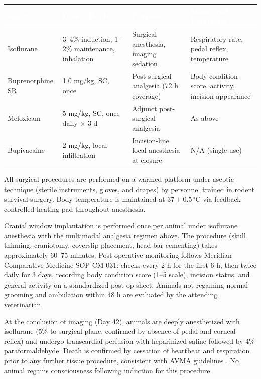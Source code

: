 \noindent
\begin{tabularx}{\linewidth}{@{}
  >{\small}p{2.6cm}
  >{\small}X
  >{\small\centering\arraybackslash}p{2.0cm}
  >{\small}p{2.6cm}
  @{}}
\toprule
\rowcolor{VetTeal}
\textcolor{white}{\textbf{Agent}} &
\textcolor{white}{\textbf{Dose / Route}} &
\textcolor{white}{\textbf{Purpose}} &
\textcolor{white}{\textbf{Monitored Parameter}} \\
\midrule
Isoflurane & 3--4\% induction, 1--2\% maintenance, inhalation & Surgical anesthesia, imaging
  sedation & Respiratory rate, pedal reflex, temperature \\
\rowcolor{LightFog}
Buprenorphine SR & 1.0 mg/kg, SC, once & Post-surgical analgesia (72 h coverage) & Body
  condition score, activity, incision appearance \\
Meloxicam & 5 mg/kg, SC, once daily $\times$ 3 d & Adjunct post-surgical analgesia & As above \\
\rowcolor{LightFog}
Bupivacaine & 2 mg/kg, local infiltration & Incision-line local anesthesia at closure &
  N/A (single use) \\
\bottomrule
\end{tabularx}

{\footnotesize\color{ProtocolNavy!70}
All surgical procedures are performed on a warmed platform under aseptic technique
(sterile instruments, gloves, and drapes) by personnel trained in rodent survival surgery.
Body temperature is maintained at $37\pm0.5\,^{\circ}\mathrm{C}$ via feedback-controlled
heating pad throughout anesthesia.\par}

\vspace{6pt}

Cranial window implantation is performed once per animal under isoflurane anesthesia with the
multimodal analgesia regimen above. The procedure (skull thinning, craniotomy, coverslip
placement, head-bar cementing) takes approximately 60--75 minutes. Post-operative monitoring
follows Meridian Comparative Medicine SOP CM-031: checks every 2 h for the first 6 h, then
twice daily for 3 days, recording body condition score (1--5 scale), incision status, and
general activity on a standardized post-op sheet. Animals not regaining normal grooming and
ambulation within 48 h are evaluated by the attending veterinarian.

\vspace{6pt}

At the conclusion of imaging (Day 42), animals are deeply anesthetized with isoflurane
(5\% to surgical plane, confirmed by absence of pedal and corneal reflex) and undergo
transcardial perfusion with heparinized saline followed by 4\% paraformaldehyde. Death is
confirmed by cessation of heartbeat and respiration prior to any further tissue procedure,
consistent with AVMA guidelines \cite{avma2020euthanasia}. No animal regains consciousness
following induction for this procedure.

